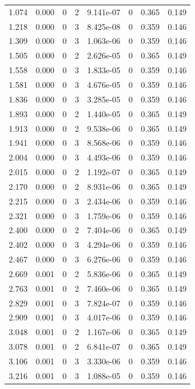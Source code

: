 \documentclass[preview]{standalone}
\begin{document}
{{\begin{tabular}{L{1.2cm}C{1.2cm} C{0.3cm}C{0.5cm} C{1.4cm}C{1.4cm} C{1.4cm}C{1.4cm}}
  1.074  &  0.000  & 0     &  2 &  9.141e-07  & 0  & 0.365 &  0.149   \\ 
  1.218  &  0.000  & 0     &  3 &  8.425e-08  & 0  & 0.359 &  0.146   \\ 
  1.309  &  0.000  & 0     &  3 &  1.063e-06  & 0  & 0.359 &  0.146   \\ 
  1.505  &  0.000  & 0     &  2 &  2.626e-05  & 0  & 0.365 &  0.149   \\ 
  1.558  &  0.000  & 0     &  3 &  1.833e-05  & 0  & 0.359 &  0.146   \\ 
  1.581  &  0.000  & 0     &  3 &  4.676e-05  & 0  & 0.359 &  0.146   \\ 
  1.836  &  0.000  & 0     &  3 &  3.285e-05  & 0  & 0.359 &  0.146   \\ 
  1.893  &  0.000  & 0     &  2 &  1.440e-05  & 0  & 0.365 &  0.149   \\ 
  1.913  &  0.000  & 0     &  2 &  9.538e-06  & 0  & 0.365 &  0.149   \\ 
  1.941  &  0.000  & 0     &  3 &  8.568e-06  & 0  & 0.359 &  0.146   \\ 
  2.004  &  0.000  & 0     &  3 &  4.493e-06  & 0  & 0.359 &  0.146   \\ 
  2.015  &  0.000  & 0     &  2 &  1.192e-07  & 0  & 0.365 &  0.149   \\ 
  2.170  &  0.000  & 0     &  2 &  8.931e-06  & 0  & 0.365 &  0.149   \\ 
  2.215  &  0.000  & 0     &  3 &  2.434e-06  & 0  & 0.359 &  0.146   \\ 
  2.321  &  0.000  & 0     &  3 &  1.759e-06  & 0  & 0.359 &  0.146   \\ 
  2.400  &  0.000  & 0     &  2 &  7.404e-06  & 0  & 0.365 &  0.149   \\ 
  2.402  &  0.000  & 0     &  3 &  4.294e-06  & 0  & 0.359 &  0.146   \\ 
  2.467  &  0.000  & 0     &  3 &  6.276e-06  & 0  & 0.359 &  0.146   \\ 
  2.669  &  0.001  & 0     &  2 &  5.836e-06  & 0  & 0.365 &  0.149   \\ 
  2.763  &  0.001  & 0     &  2 &  7.460e-06  & 0  & 0.365 &  0.149   \\ 
  2.829  &  0.001  & 0     &  3 &  7.824e-07  & 0  & 0.359 &  0.146   \\ 
  2.909  &  0.001  & 0     &  3 &  4.017e-06  & 0  & 0.359 &  0.146   \\ 
  3.048  &  0.001  & 0     &  2 &  1.167e-06  & 0  & 0.365 &  0.149   \\ 
  3.078  &  0.001  & 0     &  2 &  6.841e-07  & 0  & 0.365 &  0.149   \\ 
  3.106  &  0.001  & 0     &  3 &  3.330e-06  & 0  & 0.359 &  0.146   \\ 
  3.216  &  0.001  & 0     &  3 &  1.088e-05  & 0  & 0.359 &  0.146   \\ 
\hline 
\end{tabular} 

}}
\end{document}
